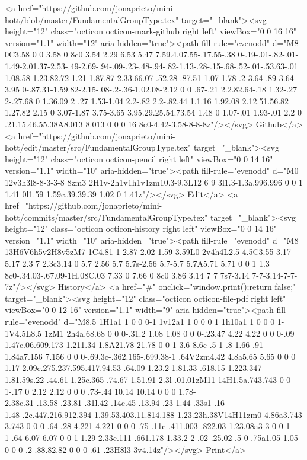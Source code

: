       <a href="https://github.com/jonaprieto/mini-hott/blob/master/FundamentalGroupType.tex" target="_blank"><svg height="12" class="octicon octicon-mark-github right left" viewBox="0 0 16 16" version="1.1" width="12" aria-hidden="true"><path fill-rule="evenodd" d="M8 0C3.58 0 0 3.58 0 8c0 3.54 2.29 6.53 5.47 7.59.4.07.55-.17.55-.38 0-.19-.01-.82-.01-1.49-2.01.37-2.53-.49-2.69-.94-.09-.23-.48-.94-.82-1.13-.28-.15-.68-.52-.01-.53.63-.01 1.08.58 1.23.82.72 1.21 1.87.87 2.33.66.07-.52.28-.87.51-1.07-1.78-.2-3.64-.89-3.64-3.95 0-.87.31-1.59.82-2.15-.08-.2-.36-1.02.08-2.12 0 0 .67-.21 2.2.82.64-.18 1.32-.27 2-.27.68 0 1.36.09 2 .27 1.53-1.04 2.2-.82 2.2-.82.44 1.1.16 1.92.08 2.12.51.56.82 1.27.82 2.15 0 3.07-1.87 3.75-3.65 3.95.29.25.54.73.54 1.48 0 1.07-.01 1.93-.01 2.2 0 .21.15.46.55.38A8.013 8.013 0 0 0 16 8c0-4.42-3.58-8-8-8z"/></svg> Github</a>
      <a href="https://github.com/jonaprieto/mini-hott/edit/master/src/FundamentalGroupType.tex" target="_blank"><svg height="12" class="octicon octicon-pencil right left" viewBox="0 0 14 16" version="1.1" width="10" aria-hidden="true"><path fill-rule="evenodd" d="M0 12v3h3l8-8-3-3-8 8zm3 2H1v-2h1v1h1v1zm10.3-9.3L12 6 9 3l1.3-1.3a.996.996 0 0 1 1.41 0l1.59 1.59c.39.39.39 1.02 0 1.41z"/></svg> Edit</a>
      <a href="https://github.com/jonaprieto/mini-hott/commits/master/src/FundamentalGroupType.tex" target="_blank"><svg height="12" class="octicon octicon-history right left" viewBox="0 0 14 16" version="1.1" width="10" aria-hidden="true"><path fill-rule="evenodd" d="M8 13H6V6h5v2H8v5zM7 1C4.81 1 2.87 2.02 1.59 3.59L0 2v4h4L2.5 4.5C3.55 3.17 5.17 2.3 7 2.3c3.14 0 5.7 2.56 5.7 5.7s-2.56 5.7-5.7 5.7A5.71 5.71 0 0 1 1.3 8c0-.34.03-.67.09-1H.08C.03 7.33 0 7.66 0 8c0 3.86 3.14 7 7 7s7-3.14 7-7-3.14-7-7-7z"/></svg> History</a>
      <a  href="#" onclick="window.print();return false;" target="_blank"><svg height="12" class="octicon octicon-file-pdf right left" viewBox="0 0 12 16" version="1.1" width="9" aria-hidden="true"><path fill-rule="evenodd" d="M8.5 1H1a1 1 0 0 0-1 1v12a1 1 0 0 0 1 1h10a1 1 0 0 0 1-1V4.5L8.5 1zM1 2h4a.68.68 0 0 0-.31.2 1.08 1.08 0 0 0-.23.47 4.22 4.22 0 0 0-.09 1.47c.06.609.173 1.211.34 1.8A21.78 21.78 0 0 1 3.6 8.6c-.5 1-.8 1.66-.91 1.84a7.156 7.156 0 0 0-.69.3c-.362.165-.699.38-1 .64V2zm4.42 4.8a5.65 5.65 0 0 0 1.17 2.09c.275.237.595.417.94.53-.64.09-1.23.2-1.81.33-.618.15-1.223.347-1.81.59s.22-.44.61-1.25c.365-.74.67-1.51.91-2.3l-.01.01zM11 14H1.5a.743.743 0 0 1-.17 0 2.12 2.12 0 0 0 .73-.44 10.14 10.14 0 0 0 1.78-2.38c.31-.13.58-.23.81-.31l.42-.14c.45-.13.94-.23 1.44-.33s1-.16 1.48-.2c.447.216.912.394 1.39.53.403.11.814.188 1.23.23h.38V14H11zm0-4.86a3.743 3.743 0 0 0-.64-.28 4.221 4.221 0 0 0-.75-.11c-.411.003-.822.03-1.23.08a3 3 0 0 1-1-.64 6.07 6.07 0 0 1-1.29-2.33c.111-.661.178-1.33.2-2 .02-.25.02-.5 0-.75a1.05 1.05 0 0 0-.2-.88.82.82 0 0 0-.61-.23H8l3 3v4.14z"/></svg> Print</a>
